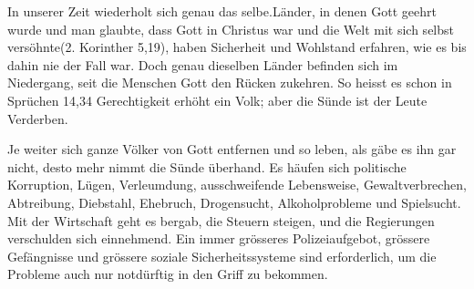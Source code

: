 \documentclass{../inc/mybib}
\begin{document}
In unserer Zeit wiederholt sich genau das selbe.Länder, in denen Gott geehrt wurde und man glaubte, dass \flqq Gott in Christus war und die Welt mit sich selbst versöhnte\frqq{}(2. Korinther 5,19), haben Sicherheit und Wohlstand erfahren, wie es bis dahin nie der Fall war. Doch genau dieselben Länder befinden sich im Niedergang, seit die Menschen Gott den Rücken zukehren. So heisst es schon in Sprüchen 14,34 \flqq Gerechtigkeit erhöht ein Volk; aber die Sünde ist der Leute Verderben.\frqq

Je weiter sich ganze Völker von Gott entfernen und so leben, als gäbe es ihn gar nicht, desto mehr nimmt die Sünde überhand. Es häufen sich politische Korruption, Lügen, Verleumdung, ausschweifende Lebensweise, Gewaltverbrechen, Abtreibung, Diebstahl, Ehebruch, Drogensucht, Alkoholprobleme und Spielsucht. Mit der Wirtschaft geht es bergab, die Steuern steigen, und die Regierungen verschulden sich einnehmend. Ein immer grösseres Polizeiaufgebot, grössere Gefängnisse und grössere soziale Sicherheitssysteme sind erforderlich, um die Probleme auch nur notdürftig in den Griff zu bekommen.
\end{document}
